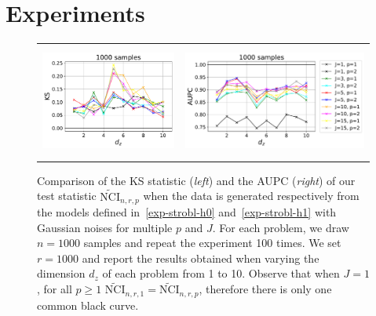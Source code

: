 \section{Experiments}
\label{sec-experiments-main}
\begin{figure}[ht]
\begin{tabular}{cc} 
\includegraphics[height=3.7cm]{sections/appendix/independence_testing_kernel/figures_J_p/fig_ours_J_p_ks.pdf}& 
\includegraphics[height=3.7cm]{sections/appendix/independence_testing_kernel/figures_J_p/fig_ours_J_p_aupc.pdf}
\end{tabular}
\caption{Comparison of the KS statistic (\emph{left}) and the AUPC (\emph{right}) of our test statistic $\widetilde{\text{NCI}}_{n,r,p}$ when the data is generated respectively from the models defined in~\eqref{exp-strobl-h0} and~\eqref{exp-strobl-h1} with Gaussian noises for multiple $p$ and $J$. For each problem, we draw $n=1000$ samples and repeat the experiment 100 times. We set $r=1000$ and report the results obtained when varying the dimension $d_z$ of each problem from 1 to 10. Observe that when $J=1$, for all $p\geq 1$ $\widetilde{\text{NCI}}_{n,r,1}=\widetilde{\text{NCI}}_{n,r,p}$, therefore there is only one  common black curve.
\label{fig-exp-param}}
\vspace{-0.4cm}
\end{figure}

